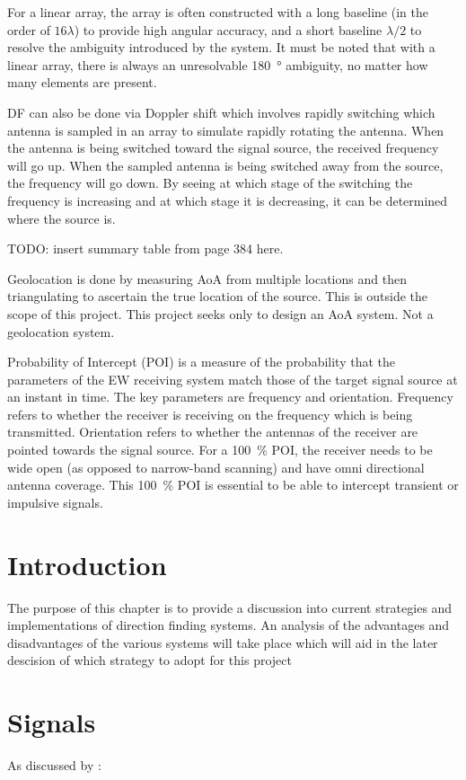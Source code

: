 For a linear array, the array is often constructed with a long baseline (in the order of \(16\lambda\)) to provide high angular accuracy, and a short baseline \(\lambda/2\) to resolve the ambiguity introduced by the system. It must be noted that with a linear array, there is always an unresolvable \SI{180}{\degree} ambiguity, no matter how many elements are present.

DF can also be done via Doppler shift which involves rapidly switching which antenna is sampled in an array to simulate rapidly rotating the antenna. When the antenna is being switched toward the signal source, the received frequency will go up. When the sampled antenna is being switched away from the source, the frequency will go down. By seeing at which stage of the switching the frequency is increasing and at which stage it is decreasing, it can be determined where the source is.

TODO: insert summary table from page 384 here.

Geolocation is done by measuring AoA from multiple locations and then triangulating to ascertain the true location of the source. This is outside the scope of this project. This project seeks only to design an AoA system. Not a geolocation system. 

Probability of Intercept (POI) is a measure of the probability that the parameters of the EW receiving system match those of the target signal source at an instant in time. The key parameters are frequency and orientation. Frequency refers to whether the receiver is receiving on the frequency which is being transmitted. Orientation refers to whether the antennas of the receiver are pointed towards the signal source. 
For a \SI{100}{\percent} POI, the receiver needs to be wide open (as opposed to narrow-band scanning) and have omni directional antenna coverage. This \SI{100}{\percent} POI is essential to be able to intercept transient or impulsive signals.

\section{Introduction}
The purpose of this chapter is to provide a discussion into current strategies and implementations of direction finding systems. An analysis of the advantages and disadvantages of the various systems will take place which will aid in the later descision of which strategy to adopt for this project

\section{Signals}
As discussed by \cite{krim1996two}:

